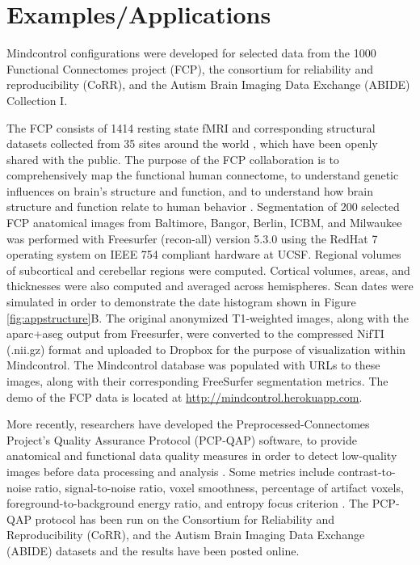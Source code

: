 \section{Examples/Applications}

Mindcontrol configurations were developed for selected data from the 1000 Functional Connectomes project (FCP), the consortium for reliability and reproducibility (CoRR), and the Autism Brain Imaging Data Exchange (ABIDE) Collection I. 

The FCP consists of 1414 resting state fMRI and corresponding structural datasets collected from 35 sites around the world  \cite{biswal2010toward}, which have been openly shared with the public. The purpose of the FCP collaboration is to comprehensively map the functional human connectome, to understand genetic influences on brain's structure and function, and to understand how brain structure and function relate to human behavior \cite{biswal2010toward}. Segmentation of 200 selected FCP anatomical images from Baltimore, Bangor, Berlin, ICBM, and Milwaukee was performed with Freesurfer (recon-all) version 5.3.0 \cite{fischl2002whole} using the RedHat 7 operating system on IEEE 754 compliant hardware at UCSF. Regional volumes of  subcortical and cerebellar regions were computed. Cortical volumes, areas, and thicknesses were also computed and averaged across hemispheres. Scan dates were simulated in order to demonstrate the date histogram shown in Figure \ref{fig:appstructure}B. The original anonymized T1-weighted images, along with the aparc+aseg output from Freesurfer, were converted to the compressed NifTI (.nii.gz) format and uploaded to Dropbox for the purpose of visualization within Mindcontrol. The Mindcontrol database was populated with URLs to these images, along with their corresponding FreeSurfer segmentation metrics. The demo of the FCP data is located at \url{http://mindcontrol.herokuapp.com}. 

More recently, researchers have developed the Preprocessed-Connectomes Project's Quality Assurance Protocol (PCP-QAP) software, to provide anatomical and functional data quality measures in order to detect low-quality images before data processing and analysis \cite{shehzadpreprocessed}. Some metrics include contrast-to-noise ratio, signal-to-noise ratio, voxel smoothness, percentage of artifact voxels, foreground-to-background energy ratio, and entropy focus criterion \cite{shehzadpreprocessed}. The PCP-QAP protocol has been run on the  Consortium for Reliability and Reproducibility (CoRR), and the Autism Brain Imaging Data Exchange (ABIDE) datasets and the results have been posted online. 

